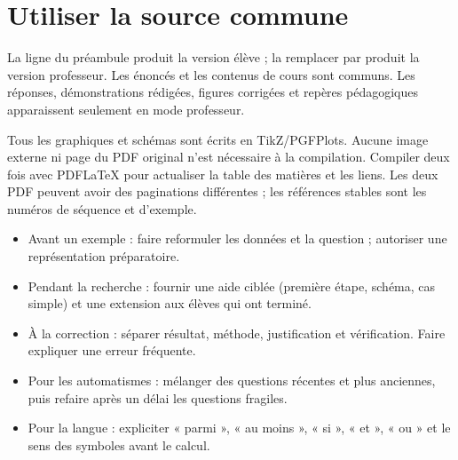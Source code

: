 \ifprof
\clearpage\renewcommand{\titreseq}{Annexes professeur}
\section*{Utiliser la source commune}
\begin{cours}
La ligne \texttt{\string\proffalse} du préambule produit la version élève ; la remplacer par \texttt{\string\proftrue} produit la version professeur. Les énoncés et les contenus de cours sont communs. Les réponses, démonstrations rédigées, figures corrigées et repères pédagogiques apparaissent seulement en mode professeur.
\end{cours}
Tous les graphiques et schémas sont écrits en TikZ/PGFPlots. Aucune image externe ni page du PDF original n'est nécessaire à la compilation. Compiler deux fois avec PDFLaTeX pour actualiser la table des matières et les liens. Les deux PDF peuvent avoir des paginations différentes ; les références stables sont les numéros de séquence et d'exemple.
\begin{methode}
\begin{itemize}
\item Avant un exemple : faire reformuler les données et la question ; autoriser une représentation préparatoire.
\item Pendant la recherche : fournir une aide ciblée (première étape, schéma, cas simple) et une extension aux élèves qui ont terminé.
\item À la correction : séparer résultat, méthode, justification et vérification. Faire expliquer une erreur fréquente.
\item Pour les automatismes : mélanger des questions récentes et plus anciennes, puis refaire après un délai les questions fragiles.
\item Pour la langue : expliciter « parmi », « au moins », « si », « et », « ou » et le sens des symboles avant le calcul.
\end{itemize}
\end{methode}
